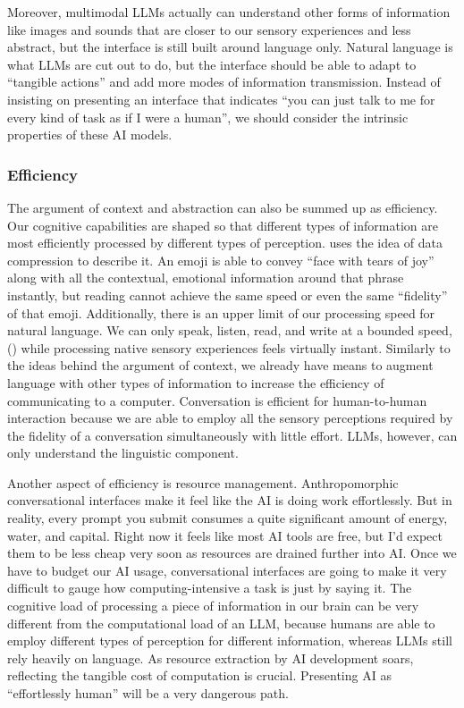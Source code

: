 \documentclass[12pt]{article}
\begin{document}
Moreover, multimodal LLMs actually can understand other forms of information like images and sounds that are closer to our sensory experiences and less abstract, but the interface is still built around language only. Natural language is what LLMs are cut out to do, but the interface should be able to adapt to ``tangible actions'' and add more modes of information transmission. Instead of insisting on presenting an interface that indicates ``you can just talk to me for every kind of task as if I were a human'', we should consider the intrinsic properties of these AI models.

\subsubsection{Efficiency}
The argument of context and abstraction can also be summed up as efficiency. Our cognitive capabilities are shaped so that different types of information are most efficiently processed by different types of perception. \cite{efficiency} uses the idea of data compression to describe it. An emoji is able to convey ``face with tears of joy'' along with all the contextual, emotional information around that phrase instantly, but reading cannot achieve the same speed or even the same ``fidelity'' of that emoji. Additionally, there is an upper limit of our processing speed for natural language. We can only speak, listen, read, and write at a bounded speed, (\cite{reading-speed}) while processing native sensory experiences feels virtually instant. Similarly to the ideas behind the argument of context, we already have means to augment language with other types of information to increase the efficiency of communicating to a computer. Conversation is efficient for human-to-human interaction because we are able to employ all the sensory perceptions required by the fidelity of a conversation simultaneously with little effort. LLMs, however, can only understand the linguistic component.

Another aspect of efficiency is resource management. Anthropomorphic conversational interfaces make it feel like the AI is doing work effortlessly. But in reality, every prompt you submit consumes a quite significant amount of energy, water, and capital. Right now it feels like most AI tools are free, but I'd expect them to be less cheap very soon as resources are drained further into AI. Once we have to budget our AI usage, conversational interfaces are going to make it very difficult to gauge how computing-intensive a task is just by saying it. The cognitive load of processing a piece of information in our brain can be very different from the computational load of an LLM, because humans are able to employ different types of perception for different information, whereas LLMs still rely heavily on language. As resource extraction by AI development soars, reflecting the tangible cost of computation is crucial. Presenting AI as ``effortlessly human'' will be a very dangerous path.
\end{document}

